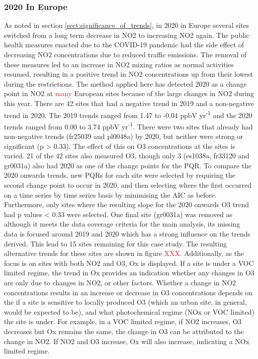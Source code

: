 \documentclass[journal abbreviation, manuscript]{copernicus}
\begin{document}
\subsubsection{2020 In Europe} \label{sect:2020_in_europe}
As noted in section \ref{sect:significance_of_trends}, in 2020 in Europe several sites switched from a long term decrease in NO2 to increasing NO2 again. The public health measures enacted due to the COVID-19 pandemic had the side effect of decreasing NO2 concentrations due to reduced traffic emissions. The removal of these measures led to an increase in NO2 mixing ratios as normal activities resumed, resulting in a positive trend in NO2 concentrations up from their lowest during the restrictions. The method applied here has detected 2020 as a change point in NO2 at \textcolor{red}{many} European sites because of the large changes in NO2 during this year. There are 42 sites that had a negative trend in 2019 and a non-negative trend in 2020. The 2019 trends ranged from 1.47 to -0.04 ppbV yr\textsuperscript{-1} and the 2020 trends ranged from 0.00 to 3.74 ppbV yr\textsuperscript{-1}. There were two sites that already had non-negative trends (fr25039 and pl0048a) by 2020, but neither were strong or significant (p > 0.33). 
The effect of this on O3 concentrations at the sites is varied.  21 of the 42 sites also measured O3, though only 3 (es1038a, fr33120 and gr0031a) also had 2020 as one of the change points for the PQR. To compare the 2020 onwards trends, new PQRs for each site were selected by requiring the second change point to occur in 2020, and then selecting where the first occurred on a time series by time series basis by minimising the AIC as before. Furthermore, only sites where the resulting slope for the 2020 onwards O3 trend had p values < 0.33 were selected. One final site (gr0031a) was removed as although it meets the data coverage criteria for the main analysis, its missing data is focused around 2019 and 2020 which has a strong influence on the trends derived. This lead to 15 sites remaining for this case study. 
The resulting alternative trends for these sites are shown in figure \textcolor{red}{XXX}. Additionally, as the focus is on sites with both NO2 and O3, Ox is displayed. If a site is under a VOC limited regime, the trend in Ox provides an indication whether any changes in O3 are only due to changes in NO2, or other factors. Whether a change in NO2 concentrations results in an increase or decrease in O3 concentrations depends on the if a site is sensitive to locally produced O3 (which an urban site, in general, would be expected to be), and what photochemical regime (NOx or VOC limited) the site is under. For example, in a VOC limited regime, if NO2 increases, O3 decreases but Ox remains the same, the change in O3 can be attributed to the change in NO2. If NO2 and O3 increase, Ox will also increase, indicating a NOx limited regime.
\end{document}
